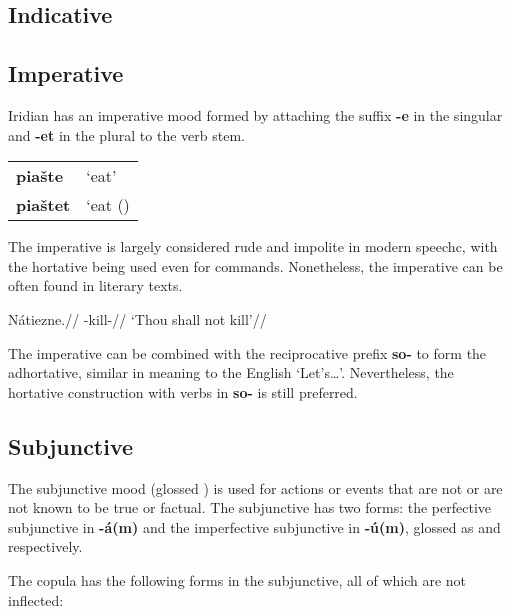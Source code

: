 \subsection{Indicative}

\subsection{Imperative}
\par Iridian has an imperative mood formed by attaching the suffix \textbf{-e} in the singular and \textbf{-et} in the plural to the verb stem.

\begin{table}[h!]
	\begin{tabular}{ll}
		\textbf{pia\v{s}te} & `eat'\\
		\textbf{pia\v{s}tet} &`eat (\mk{pl})\\		
	\end{tabular}
\end{table}

\par The imperative is largely considered rude and impolite in modern speechc, with the hortative being used even for commands. Nonetheless, the imperative can be often found in literary texts.

\pex
\begingl
\gla Nátiezne.//
\glb {}-kill-//
\glft`Thou shall not kill'//
\endgl
\xe

\par The imperative can be combined with the reciprocative prefix \textbf{so-} to form the adhortative, similar in meaning to the English `Let's\ldots'. Nevertheless, the hortative construction with verbs in \textbf{so-} is still preferred.
\subsection{Subjunctive}
\par The subjunctive mood (glossed ) is used for actions or events that are not or are not known to be true or factual. The subjunctive has two forms: the perfective subjunctive in \textbf{-á(m)} and the imperfective subjunctive in \textbf{-ú(m)}, glossed as  and  respectively.
\par The copula has the following forms in the subjunctive, all of which are not inflected:

